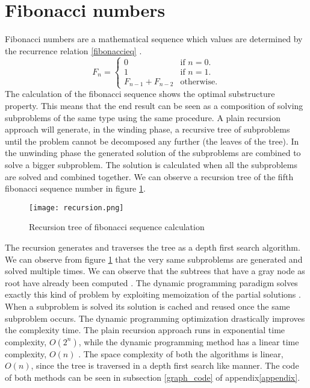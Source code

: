 \documentclass[runningheads]{llncs}
\begin{document}
\section{Fibonacci numbers}
Fibonacci numbers are a mathematical sequence which values are
determined by the recurrence relation \ref{fibonaccieq}
\cite{fib_num}.
\begin{equation}\label{fibonaccieq}
  F_n=\begin{cases}
  0 & \text{if $n=0$}.\\
  1 & \text{if $n=1$}.\\
  F_{n-1} + F_{n-2} & \text{otherwise}.
  \end{cases}
\end{equation}
The calculation of the fibonacci sequence shows the optimal
substructure property. This means that the end result can be seen as a
composition of solving subproblems of the same type using the same
procedure. A plain recursion approach will generate, in the winding
phase, a recursive tree of subproblems until the problem cannot be
decomposed any further (the leaves of the tree). In the unwinding
phase the generated solution of the subproblems are combined to solve
a bigger subproblem. The solution is calculated when all the
subproblems are solved and combined together. We can observe a
recursion tree of the fifth fibonacci sequence number in figure \ref{fig1}.
\begin{figure}
\texttt{[image: recursion.png]}
\caption{Recursion tree of fibonacci sequence calculation} \label{fig1}
\end{figure}
The recursion generates and traverses the tree as a depth first search
algorithm. We can observe from figure \ref{fig1} that the very same
subproblems are generated and solved multiple times. We can observe
that the subtrees that have a gray node as root have already been
computed \cite{fibo}. The dynamic programming paradigm solves exactly
this kind of problem by exploiting memoization of the partial
solutions \cite{dprogramming}. When a subproblem is solved its
solution is cached and reused once the same subproblem occurs. The
dynamic programming optimization drastically improves the complexity
time. The plain recursion approach runs in exponential time complexity,
$O(2^n)$, while the dynamic programming method has a linear time
complexity, $O(n)$ \cite{fibo}. The space complexity of both the algorithms is
linear, $O(n)$, since the tree is traversed in a depth first search
like manner. The code of both methods can be seen in subsection
\ref{graph_code} of appendix\ref{appendix}.
\end{document}
